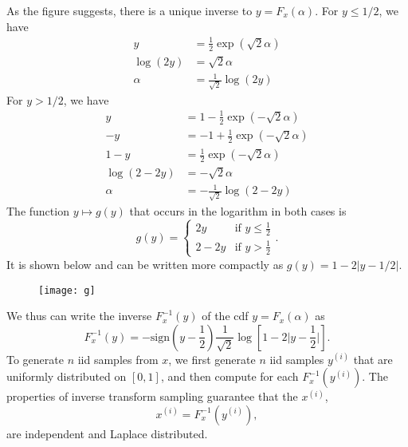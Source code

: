 \begin{solution}
  As the figure suggests, there is a unique inverse to $y = F_x(\alpha)$. For $y \le 1/2$, we have
   \begin{align}
     y & =  \frac{1}{2} \exp\left(\sqrt{2} \alpha\right)\\
     \log(2y) & = \sqrt{2} \alpha\\
     \alpha & = \frac{1}{\sqrt{2}} \log (2y)
   \end{align}
  For $y > 1/2$, we have
   \begin{align}
     y & =  1 - \frac{1}{2}  \exp\left(-\sqrt{2} \alpha \right)\\
     -y & =  -1 + \frac{1}{2}  \exp\left(-\sqrt{2} \alpha \right)\\
     1-y &= \frac{1}{2}  \exp\left(-\sqrt{2} \alpha \right) \\
     \log( 2-2y) & = -\sqrt{2} \alpha \\
     \alpha & = -\frac{1}{\sqrt{2}} \log(2-2y)
   \end{align}
  The function $y \mapsto g(y)$ that occurs in the logarithm in both cases is
   \begin{equation}
     g(y) = \begin{cases}
       2 y & \text{if } y\le \frac{1}{2}\\
       2-2y & \text{if } y> \frac{1}{2}
     \end{cases}.
   \end{equation}
  It is shown below and can be written more compactly as $g(y) = 1-2|y-1/2|$.
    \begin{figure}[h]
     \centering
     \texttt{[image: g]}
    \end{figure}

  We thus can write the inverse $F_x^{-1}(y)$ of the cdf $y=F_x(\alpha)$ as
    \begin{equation}
      F_x^{-1}(y) = -\text{sign}\left(y-\frac{1}{2}\right) \frac{1}{\sqrt{2}} \log\left[  1-2\big|y-\frac{1}{2}\big| \right].
    \end{equation}
  To generate $n$ iid samples from $x$, we first generate $n$
  iid samples $y^{(i)}$ that are uniformly distributed on $[0,1]$,
  and then compute for each $F_x^{-1}(y^{(i)})$. The properties of
  inverse transform sampling guarantee that the $x^{(i)}$,
    \begin{equation}
      x^{(i)} = F_x^{-1}(y^{(i)}),
    \end{equation}
  are independent and Laplace distributed.
  \end{solution}

